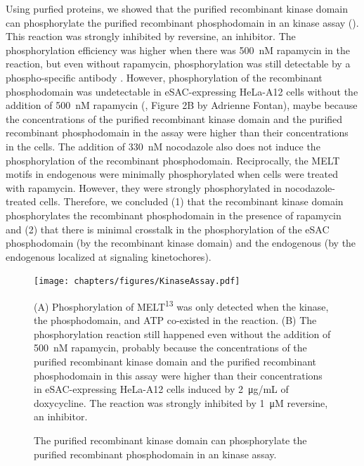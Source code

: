 Using purfied proteins, we showed that the purified recombinant  kinase domain can phosphorylate the purified recombinant  phosphodomain in an  kinase assay (). This reaction was strongly inhibited by reversine, an  inhibitor. The phosphorylation efficiency was higher when there was \SI{500}{nM} rapamycin in the reaction, but even without rapamycin, phosphorylation was still detectable by a phospho-specific antibody \cite{MELTActivity}. However, phosphorylation of the recombinant phosphodomain was undetectable in eSAC-expressing HeLa-A12 cells without the addition of \SI{500}{nM} rapamycin (\cite{eSAC}, Figure 2B by Adrienne Fontan), maybe because the concentrations of the purified recombinant  kinase domain and the purified recombinant  phosphodomain in the  assay were higher than their concentrations in the cells. The addition of \SI{330}{nM} nocodazole also does not induce the phosphorylation of the recombinant  phosphodomain. Reciprocally, the MELT motifs in endogenous  were minimally phosphorylated when cells were treated with rapamycin. However, they were strongly phosphorylated in nocodazole-treated cells. Therefore, we concluded (1) that the recombinant  kinase domain phosphorylates the recombinant  phosphodomain in the presence of rapamycin and (2) that there is minimal crosstalk in the phosphorylation of the eSAC phosphodomain (by the recombinant  kinase domain) and the endogenous  (by the endogenous  localized at signaling kinetochores).

\begin{figure}
    \centering
    \texttt{[image: chapters/figures/KinaseAssay.pdf]}
    \caption{The purified recombinant  kinase domain can phosphorylate the purified recombinant  phosphodomain in an  kinase assay.}
    \noindent\justifying (A) Phosphorylation of MELT\textsuperscript{13} was only detected when the kinase, the phosphodomain, and ATP co-existed in the reaction. (B) The phosphorylation reaction still happened even without the addition of \SI{500}{nM} rapamycin, probably because the concentrations of the purified recombinant  kinase domain and the purified recombinant  phosphodomain in this  assay were higher than their concentrations in eSAC-expressing HeLa-A12 cells induced by \SI{2}{\micro g/mL} of doxycycline. The reaction was strongly inhibited by \SI{1}{\micro M} reversine, an  inhibitor.
    \label{KinaseAssay}
\end{figure}


